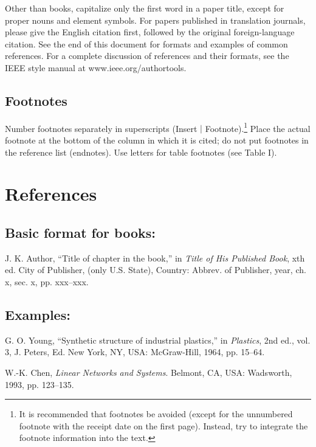 \documentclass[journal]{IEEEtran}
\begin{document}
Other than books, capitalize only the first word in a paper title, except for proper nouns and element symbols. For papers published in translation journals, please give the English citation first, followed by the original foreign-language citation. See the end of this document for formats and examples of common references. For a complete discussion of references and their formats, see the IEEE style manual at www.ieee.org/authortools.

\subsection{Footnotes}

Number footnotes separately in superscripts (Insert $\mid$ Footnote).\footnote{It is recommended that footnotes be avoided (except for the unnumbered footnote with the receipt date on the first page). Instead, try to integrate the footnote information into the text.}  Place the actual footnote at the bottom of the column in which it is cited; do not put footnotes in the reference list (endnotes). Use letters for table footnotes (see Table I). 


\section*{References}

\subsection*{Basic format for books:}

J. K. Author, ``Title of chapter in the book,'' in {\em Title of His Published Book}, xth ed. City of Publisher, (only U.S. State), Country: Abbrev. of Publisher, year, ch. x, sec. x, pp. xxx--xxx.

\subsection*{Examples:}
\def\refname{}
\begin{thebibliography}{34}

\bibitem{}G. O. Young, ``Synthetic structure of industrial plastics,'' in {\em Plastics}, 2nd ed., vol. 3, J. Peters, Ed. New York, NY, USA: McGraw-Hill, 1964, pp. 15--64.

\bibitem{}W.-K. Chen, {\it Linear Networks and Systems}. Belmont, CA, USA: Wadsworth, 1993, pp. 123--135.

\end{thebibliography}
\end{document}
